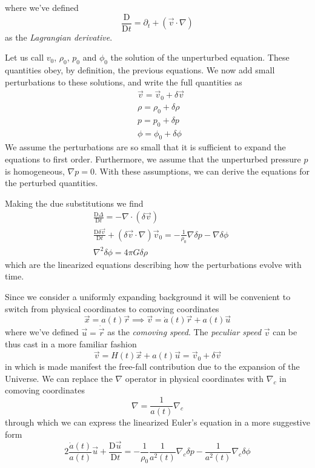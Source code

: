 where we've defined 
\begin{equation*}
    \frac{\text{D}}{\text{D}t} = \partial_{t} + (\vec{v}\cdot\nabla)
\end{equation*}
as the \emph{Lagrangian derivative}.
\par Let us call $v_{0}$, $\rho_{0}$, $p_{0}$ and $\phi_{0}$ the solution of the unperturbed equation. These quantities obey, by definition, the previous equations. We now add small perturbations to these solutions, and write the full quantities as
\begin{align*}
    & \vec{v} = \vec{v}_{0}+\delta\vec{v}\\
    & \rho = \rho_{0} + \delta\rho\\
    & p = p_{0} + \delta p\\
    & \phi = \phi_{0} + \delta\phi
\end{align*}
We assume the perturbations are so small that it is sufficient to expand the equations to first order. Furthermore, we assume that the unperturbed pressure $p$ is homogeneous, $\nabla p = 0$. With these assumptions, we can derive the equations for the perturbed quantities.
\par Making the due substitutions we find
\begin{align}
    & \frac{\text{D}\Delta}{\text{D}t} = -\nabla\cdot(\delta\vec{v})\\
    & \frac{\text{D}\delta\vec{v}}{\text{D}t} + (\delta\vec{v}\cdot\nabla)\vec{v}_{0} = -\frac{1}{\rho_{0}}\nabla\delta p -\nabla\delta\phi\\
    & \nabla^{2}\delta\phi = 4\pi G\delta\rho
\end{align}
which are the linearized equations describing how the perturbations evolve with time.
\par Since we consider a uniformly expanding background it will be convenient to switch from physical coordinates to comoving coordinates 
\begin{equation*}
    \vec{x} = a(t)\vec{r} \implies \vec{v} = \dot{a}(t)\vec{r} + a(t)\vec{u}
\end{equation*}
where we've defined $\vec{u} = \dot{\vec{r}}$ as the \emph{comoving speed}. The \emph{peculiar speed} $\vec{v}$ can be thus cast in a more familiar fashion
\begin{equation}
    \vec{v} = H(t)\vec{x} + a(t)\vec{u} = \vec{v}_{0} +\delta\vec{v}
    \label{eq:peculiarspeed}
\end{equation}
in which is made manifest the free-fall contribution due to the expansion of the Universe. We can replace the $\nabla$ operator in physical coordinates with $\nabla_{c}$ in comoving coordinates
\begin{equation}
    \nabla = \frac{1}{a(t)}\nabla_{c}
    \label{eq:comoving_gradient}
\end{equation}
through which we can express the linearized Euler's equation in a more suggestive form
\begin{equation}
    2\frac{\dot{a}(t)}{a(t)}\vec{u}+\frac{\text{D}\vec{u}}{\text{D}t} = -\frac{1}{\rho_{0}}\frac{1}{a^{2}(t)}\nabla_{c}\delta p -\frac{1}{a^{2}(t)}\nabla_{c}\delta\phi
    \label{eq:linearizedcomovingeuler}
\end{equation}

